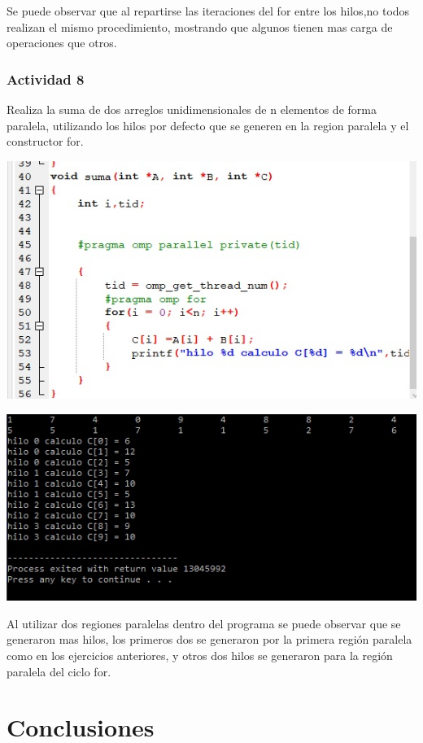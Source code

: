\documentclass[12pt,letterpaper]{article}
\begin{document}
Se puede observar que al repartirse las iteraciones del for entre los hilos,no todos realizan el mismo procedimiento, mostrando que algunos tienen mas carga de operaciones que otros.


\subsubsection*{Actividad 8}

Realiza la suma de dos arreglos unidimensionales de n elementos de forma paralela, utilizando los hilos por defecto que se generen en la region paralela y el constructor for.

\includegraphics[scale=.8]{ejercicio8.jpg}


\includegraphics[scale=1]{ejercicio81.jpg}

Al utilizar dos regiones paralelas dentro del programa se puede observar que se generaron mas hilos, los primeros dos se generaron por la primera región paralela como en los ejercicios anteriores, y otros dos hilos se generaron para la región paralela del ciclo for.


\section{Conclusiones}
\end{document}
